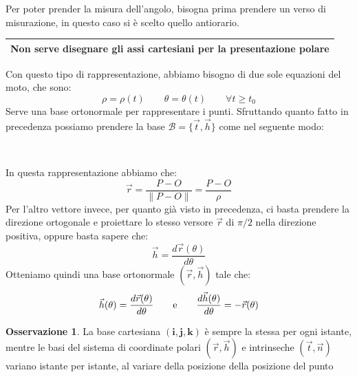 \documentclass[11pt,a4paper,twoside]{article}
\theoremstyle{definition}
\newtheorem*{oss}{Osservazione}
\begin{document}
Per poter prender la misura dell'angolo, bisogna prima prendere un verso di misurazione, in questo caso si è scelto quello antiorario.

\begin{center}
	\begin{tabular}{|c|}
		\hline
		\textbf{Non serve disegnare gli assi cartesiani per la presentazione polare}\\
		\hline
	\end{tabular}
\end{center}

Con questo tipo di rappresentazione, abbiamo bisogno di due sole equazioni del moto, che sono:
\[\rho = \rho(t)\qquad \theta = \theta(t)\qquad \forall t \geq t_0\]
Serve una base ortonormale per rappresentare i punti. Sfruttando quanto fatto in precedenza possiamo prendere la base $\mathcal B = \{\vec t, \vec h\}$ come nel seguente modo:

\begin{center}
	\\
\end{center}

In questa rappresentazione abbiamo che:
\[\vec r = \frac{P-O}{\|P-O\|} = \frac{P-O} \rho\]
Per l'altro vettore invece, per quanto già visto in precedenza, ci basta prendere la direzione ortogonale e proiettare lo stesso versore $\vec r$ di $\pi/2$ nella direzione positiva, oppure basta sapere che:
\[\vec h = \frac{d \vec r(\theta)}{d \theta}\]
Otteniamo quindi una base ortonormale $(\vec r, \vec h)$ tale che:
\[ \vec h(\theta) = \frac{d \vec r(\theta)}{d\theta}\qquad \text e \qquad \frac{d\vec h(\theta)}{d \theta} = -\vec r(\theta) \]

\begin{oss}
	La base cartesiana $(\mathbf i, \mathbf j, \mathbf k)$ è sempre la stessa per ogni istante, mentre le basi del sistema di coordinate polari $(\vec r, \vec h)$ e intrinseche $(\vec t, \vec n)$ variano istante per istante, al variare della posizione della posizione del punto
\end{oss}
\end{document}
